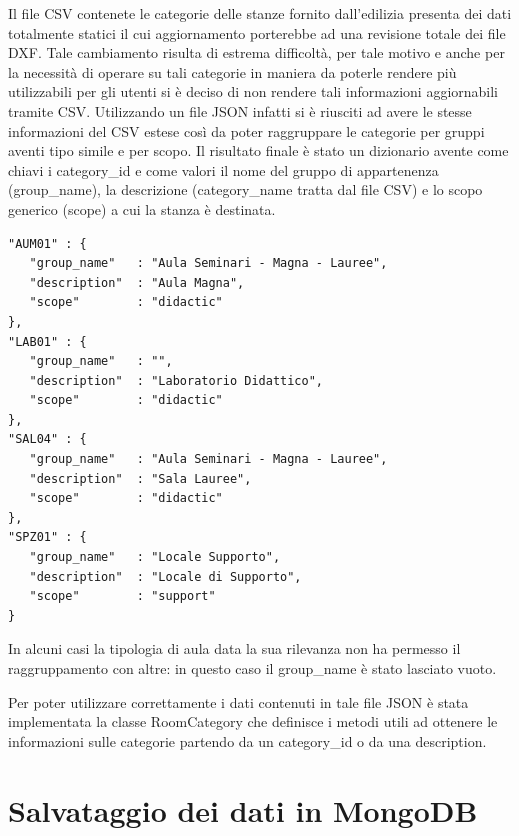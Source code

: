 \documentclass[12pt]{report}
\begin{document}
\vspace{5mm} %

Il file CSV contenete le categorie delle stanze fornito dall'edilizia presenta dei dati totalmente statici il cui aggiornamento porterebbe ad una revisione totale dei file DXF.
Tale cambiamento risulta di estrema difficoltà, per tale motivo e anche per la necessità di operare su tali categorie in maniera da poterle rendere più utilizzabili per gli utenti si è deciso di non rendere tali informazioni aggiornabili tramite CSV.
Utilizzando un file JSON infatti si è riusciti ad avere le stesse informazioni del CSV estese così da poter raggruppare le categorie per gruppi aventi tipo simile e per scopo. 
Il risultato finale è stato un dizionario avente come chiavi i category\_id e come valori il nome del gruppo di appartenenza (group\_name), la descrizione (category\_name tratta dal file CSV) e lo scopo generico (scope) a cui la stanza è destinata.

\begin{lstlisting}[label=codice,caption=Esempio delle categorie di stanze memorizzate in "'room\_category.json'", frame=single]
"AUM01" : {
   "group_name"   : "Aula Seminari - Magna - Lauree",
   "description"  : "Aula Magna",
   "scope"        : "didactic"
},
"LAB01" : {
   "group_name"   : "",
   "description"  : "Laboratorio Didattico",
   "scope"        : "didactic"
},
"SAL04" : {
   "group_name"   : "Aula Seminari - Magna - Lauree",
   "description"  : "Sala Lauree",
   "scope"        : "didactic"
},
"SPZ01" : {
   "group_name"   : "Locale Supporto",
   "description"  : "Locale di Supporto",
   "scope"        : "support"
}
\end{lstlisting}

\vspace{5mm} %

In alcuni casi la tipologia di aula data la sua rilevanza non ha permesso il raggruppamento con altre: in questo caso il group\_name è stato lasciato vuoto.

Per poter utilizzare correttamente i dati contenuti in tale file JSON è stata implementata la classe RoomCategory che definisce i metodi utili ad ottenere le informazioni sulle categorie partendo da un category\_id o da una description.


\newpage
\section{Salvataggio dei dati in MongoDB}
\end{document}

